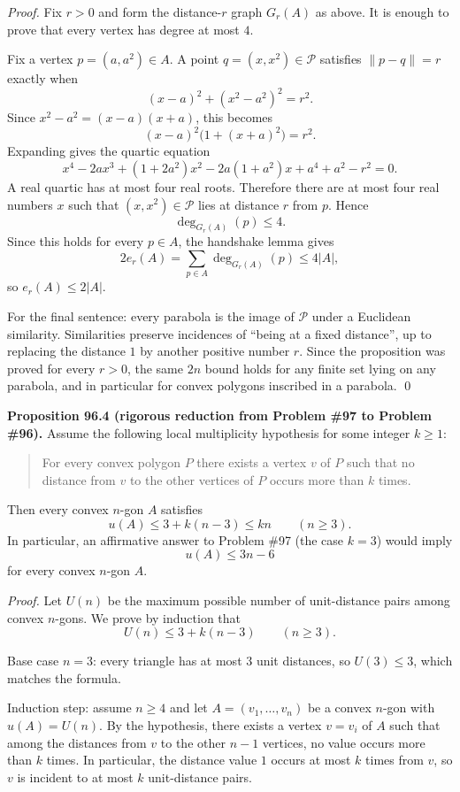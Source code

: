 \emph{Proof.}
Fix $r>0$ and form the distance-$r$ graph $G_r(A)$ as above. It is enough to prove that every vertex has degree at most $4$.

Fix a vertex $p=(a,a^2)\in A$. A point $q=(x,x^2)\in \mathcal P$ satisfies $\|p-q\|=r$ exactly when
\[
  (x-a)^2+(x^2-a^2)^2=r^2.
\]
Since $x^2-a^2=(x-a)(x+a)$, this becomes
\[
  (x-a)^2\bigl(1+(x+a)^2\bigr)=r^2.
\]
Expanding gives the quartic equation
\[
  x^4-2ax^3+(1+2a^2)x^2-2a(1+a^2)x+a^4+a^2-r^2=0.
\]
A real quartic has at most four real roots. Therefore there are at most four real numbers $x$ such that $(x,x^2)\in \mathcal P$ lies at distance $r$ from $p$. Hence
\[
  \deg_{G_r(A)}(p)\le 4.
\]
Since this holds for every $p\in A$, the handshake lemma gives
\[
  2e_r(A)=\sum_{p\in A}\deg_{G_r(A)}(p)\le 4|A|,
\]
so $e_r(A)\le 2|A|$.

For the final sentence: every parabola is the image of $\mathcal P$ under a Euclidean similarity. Similarities preserve incidences of ``being at a fixed distance'', up to replacing the distance $1$ by another positive number $r$. Since the proposition was proved for every $r>0$, the same $2n$ bound holds for any finite set lying on any parabola, and in particular for convex polygons inscribed in a parabola. \qed

\medskip
\noindent\textbf{Proposition 96.4 (rigorous reduction from Problem \#97 to Problem \#96).}
Assume the following local multiplicity hypothesis for some integer $k\ge 1$:

\begin{quote}
For every convex polygon $P$ there exists a vertex $v$ of $P$ such that no distance from $v$ to the other vertices of $P$ occurs more than $k$ times.
\end{quote}

Then every convex $n$-gon $A$ satisfies
\[
  u(A)\le 3+k(n-3)\le kn \qquad (n\ge 3).
\]
In particular, an affirmative answer to Problem \#97 (the case $k=3$) would imply
\[
  u(A)\le 3n-6
\]
for every convex $n$-gon $A$.

\emph{Proof.}
Let $U(n)$ be the maximum possible number of unit-distance pairs among convex $n$-gons.
We prove by induction that
\[
  U(n)\le 3+k(n-3) \qquad (n\ge 3).
\]

Base case $n=3$: every triangle has at most $3$ unit distances, so $U(3)\le 3$, which matches the formula.

Induction step: assume $n\ge 4$ and let $A=(v_1,\dots,v_n)$ be a convex $n$-gon with $u(A)=U(n)$. By the hypothesis, there exists a vertex $v=v_i$ of $A$ such that among the distances from $v$ to the other $n-1$ vertices, no value occurs more than $k$ times. In particular, the distance value $1$ occurs at most $k$ times from $v$, so $v$ is incident to at most $k$ unit-distance pairs.

